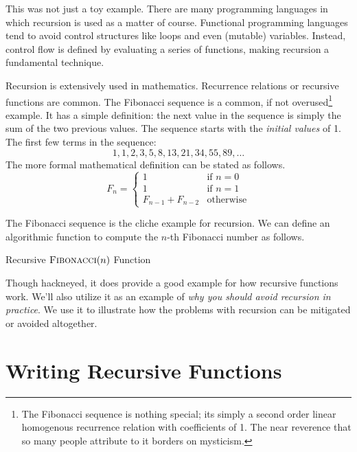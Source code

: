 This was not just a toy example.  There are many programming languages in which
recursion is used as a matter of course.  Functional programming languages
tend to avoid control structures like loops and even (mutable) variables.  
Instead, control flow is defined by evaluating a series of functions, making
recursion a fundamental technique.

Recursion is extensively used in mathematics.  Recurrence relations or
recursive functions are common.  The Fibonacci sequence is
a common, if not overused\footnote{The Fibonacci sequence is nothing
special; its simply a second order linear homogenous recurrence relation
with coefficients of 1.  The 
near reverence that so many people attribute to it borders on mysticism.}
example.  It has a simple definition: the next value in the sequence is
simply the sum of the two previous values.  The sequence starts with the 
\emph{initial values} of 1.  The first few terms in the sequence:
  $$1, 1, 2, 3, 5, 8, 13, 21, 34, 55, 89, \ldots$$
The more formal mathematical definition can be stated as follows.
\[
F_n = \left\{
\begin{array}{ll}
1 & \text{if } n = 0 \\
1 & \text{if } n = 1 \\
F_{n-1} + F_{n-2} & \text{otherwise}
\end{array}
\right.
\]

The Fibonacci sequence is the cliche example for recursion.  We can 
define an algorithmic function to compute the $n$-th Fibonacci number
as follows.

\begin{algorithm}[H]
 
\caption{Recursive $\textsc{Fibonacci}(n)$ Function}
\label{algo:recursiveFibonacci}
\end{algorithm}

Though hackneyed, it does provide a good example for how recursive functions
work.  We'll also utilize it as an example of \emph{why you should avoid
recursion in practice}.  We use it to illustrate how the problems
with recursion can be mitigated or avoided altogether.

\section{Writing Recursive Functions}

